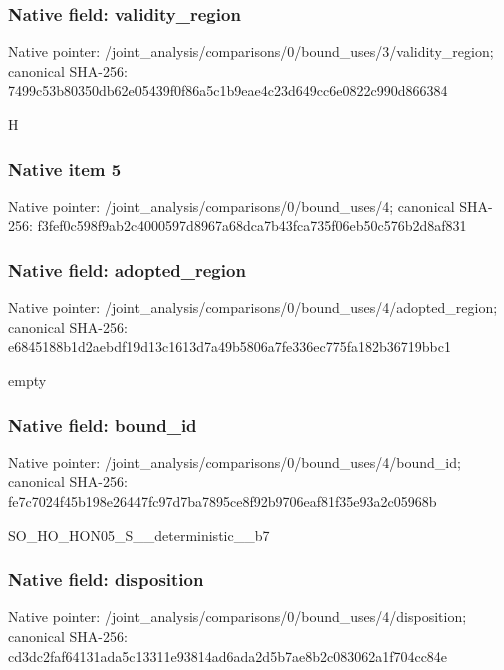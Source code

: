 \documentclass[10pt,a4paper]{article}
\begin{document}
\subsubsection{Native field: validity\_\allowbreak{}region}
Native pointer: /joint\_\allowbreak{}analysis/comparisons/0/bound\_\allowbreak{}uses/3/validity\_\allowbreak{}region; canonical SHA-256: 7499c53b80350db62e05439f0f86a5c1b9eae4c23d649cc6e0822c990d866384

\begingroup\raggedright\sloppy H\par\endgroup

\subsubsection{Native item 5}
Native pointer: /joint\_\allowbreak{}analysis/comparisons/0/bound\_\allowbreak{}uses/4; canonical SHA-256: f3fef0c598f9ab2c4000597d8967a68dca7b43fca735f06eb50c576b2d8af831

\subsubsection{Native field: adopted\_\allowbreak{}region}
Native pointer: /joint\_\allowbreak{}analysis/comparisons/0/bound\_\allowbreak{}uses/4/adopted\_\allowbreak{}region; canonical SHA-256: e6845188b1d2aebdf19d13c1613d7a49b5806a7fe336ec775fa182b36719bbc1

\begingroup\raggedright\sloppy empty\par\endgroup

\subsubsection{Native field: bound\_\allowbreak{}id}
Native pointer: /joint\_\allowbreak{}analysis/comparisons/0/bound\_\allowbreak{}uses/4/bound\_\allowbreak{}id; canonical SHA-256: fe7c7024f45b198e26447fc97d7ba7895ce8f92b9706eaf81f35e93a2c05968b

\begingroup\raggedright\sloppy SO\_\allowbreak{}HO\_\allowbreak{}HON05\_\allowbreak{}S\_\allowbreak{}\_\allowbreak{}deterministic\_\allowbreak{}\_\allowbreak{}b7\par\endgroup

\subsubsection{Native field: disposition}
Native pointer: /joint\_\allowbreak{}analysis/comparisons/0/bound\_\allowbreak{}uses/4/disposition; canonical SHA-256: cd3dc2faf64131ada5c13311e93814ad6ada2d5b7ae8b2c083062a1f704cc84e
\end{document}

